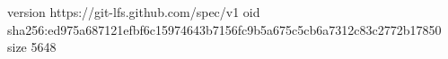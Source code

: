 version https://git-lfs.github.com/spec/v1
oid sha256:ed975a687121efbf6c15974643b7156fc9b5a675c5cb6a7312c83c2772b17850
size 5648
